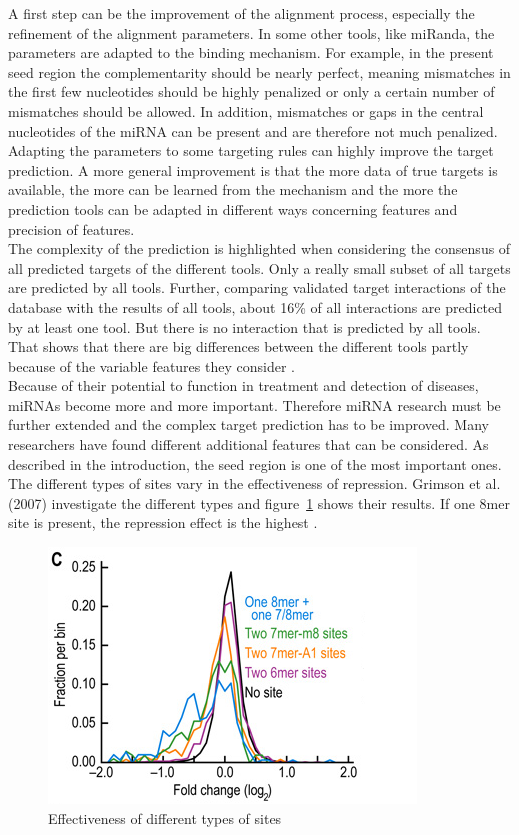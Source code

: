 \documentclass[11pt, a4paper, twoside]{book}
\begin{document}
A first step can be the improvement of the alignment process, especially the refinement of the alignment parameters. In some other tools, like miRanda, the parameters are adapted to the binding mechanism. For example, in the present seed region the complementarity should be nearly perfect, meaning mismatches in the first few nucleotides should be highly penalized or only a certain number of mismatches should be allowed. In addition, mismatches or gaps in the central nucleotides of the miRNA can be present and are therefore not much penalized. Adapting the parameters to some targeting rules can highly improve the target prediction. A more general improvement is that the more data of true targets is available, the more can be learned from the mechanism and the more the prediction tools can be adapted in different ways concerning features and precision of features.\\

The complexity of the prediction is highlighted when considering the consensus of all predicted targets of the different tools. Only a really small subset of all targets are predicted by all tools. Further, comparing validated target interactions of the database with the results of all tools, about 16\% of all interactions are predicted by at least one tool. But there is no interaction that is predicted by all tools. That shows that there are big differences between the different tools partly because of the variable features they consider \cite{Keller}.\\ 

Because of their potential to function in treatment and detection of diseases, miRNAs become more and more important. Therefore miRNA research must be further extended and the complex target prediction has to be improved. Many researchers have found different additional features that can be considered. As described in the introduction, the seed region is one of the most important ones. The different types of sites vary in the effectiveness of repression. Grimson et al. (2007) investigate the different types and figure~\ref{types} shows their results. If one 8mer site is present, the repression effect is the highest \cite{Grimson}. \\


\begin{figure}
\centering
\includegraphics[scale=0.7]{results/site_3addi.png}
\caption{Effectiveness of different types of sites}
\label{types}
\end{figure}
\end{document}
